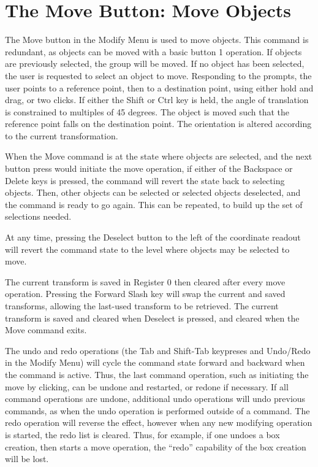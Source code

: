 \section{The {\cb Move} Button: Move Objects}
The {\cb Move} button in the {\cb Modify Menu} is used to move
objects.  This command is redundant, as objects can be moved with a
basic button 1 operation.  If objects are previously selected, the
group will be moved.  If no object has been selected, the user is
requested to select an object to move.  Responding to the prompts, the
user points to a reference point, then to a destination point, using
either hold and drag, or two clicks.  If either the {\kb Shift} or
{\kb Ctrl} key is held, the angle of translation is constrained to
multiples of 45 degrees.  The object is moved such that the reference
point falls on the destination point.  The orientation is altered
according to the current transformation.

When the {\cb Move} command is at the state where objects are
selected, and the next button press would initiate the move operation,
if either of the {\kb Backspace} or {\kb Delete} keys is pressed, the
command will revert the state back to selecting objects.  Then, other
objects can be selected or selected objects deselected, and the
command is ready to go again.  This can be repeated, to build up the
set of selections needed.

At any time, pressing the {\cb Deselect} button to the left of the
coordinate readout will revert the command state to the level where
objects may be selected to move.

The current transform is saved in Register 0 then cleared after every
move operation.  Pressing the {\kb Forward Slash} key will swap the
current and saved transforms, allowing the last-used transform to be
retrieved.  The current transform is saved and cleared when
{\cb Deselect} is pressed, and cleared when the {\cb Move} command
exits.

The undo and redo operations (the {\kb Tab} and {\kb Shift-Tab}
keypreses and {\cb Undo}/{\cb Redo} in the {\cb Modify Menu}) will
cycle the command state forward and backward when the command is
active.  Thus, the last command operation, such as initiating the
move by clicking, can be undone and restarted, or redone if
necessary.  If all command operations are undone, additional undo
operations will undo previous commands, as when the undo operation is
performed outside of a command.  The redo operation will reverse the
effect, however when any new modifying operation is started, the redo
list is cleared.  Thus, for example, if one undoes a box creation,
then starts a move operation, the ``redo'' capability of the box
creation will be lost.


